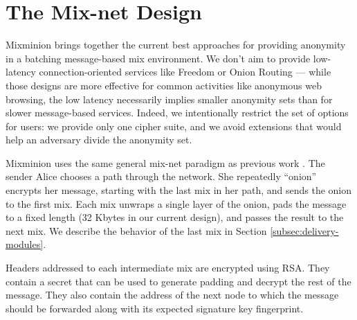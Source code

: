 \documentclass[11pt]{IEEEtran}
\begin{document}
\section{The Mix-net Design}
\label{sec:design}

Mixminion brings together the current best approaches for providing
anonymity in a batching message-based mix environment. We don't aim
to provide low-latency connection-oriented services like Freedom
\cite{freedom} or Onion Routing \cite{goldschlag99} --- while those
designs are more effective for common activities like anonymous web
browsing, the low latency necessarily implies smaller anonymity sets
than for slower message-based services. Indeed, we intentionally
restrict the set of options for users: we provide only one
cipher suite, and we avoid extensions that would help an adversary
divide the anonymity set.

Mixminion uses the same general mix-net paradigm as previous work
\cite{chaum-mix}\cite{mixmaster-attacks}\cite{babel}. The sender Alice chooses a
path through the network. She repeatedly ``onion'' encrypts her message,
starting with the last
mix in her path, and sends the onion to the first mix. Each
mix unwraps a single layer of the onion, pads the message to a fixed
length (32 Kbytes in our current design), and passes the result to the
next mix. We describe the behavior of the last mix in
Section \ref{subsec:delivery-modules}.


Headers addressed to each intermediate mix are encrypted using RSA.
They contain a secret 
that can be used to generate padding and decrypt the rest
of the message. They also contain the address of the next node to 
which the message should be forwarded along with its expected signature 
key fingerprint.


\end{document}
